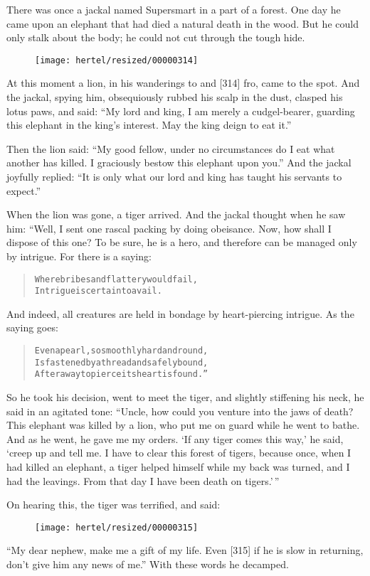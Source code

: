 \documentclass[article, twoside, 10pt]{memoir}
\renewenvironment{verbatim}{%
\begin{quote}%
\vskip -10pt%
\begin{alltt}\normalfont\small}{\end{alltt}%
\end{quote}%
\vskip -10pt
} %
\begin{document}
There was once a jackal named Supersmart in a part of a forest. One
day he came upon an elephant that had died a natural death in the
wood. But he could only stalk about the body; he could not cut
through the tough hide.

\begin{figure}[p]\texttt{[image: hertel/resized/00000314]}\end{figure}At this moment a lion, in his wanderings to and [314] fro, came to
the spot. And the jackal, spying him, obsequiously rubbed his scalp
in the dust, clasped his lotus paws, and said:
``My lord and king, I am merely a cudgel-bearer, guarding this elephant in the king's interest. May the king deign to eat it.''

Then the lion said:
``My good fellow, under no circumstances do I eat what another has killed. I graciously bestow this elephant upon you.''
And the jackal joyfully replied:
``It is only what our lord and king has taught his servants to expect.''

When the lion was gone, a tiger arrived. And the jackal thought
when he saw him: “Well, I sent one rascal packing by doing
obeisance. Now, how shall I dispose of this one? To be sure, he is
a hero, and therefore can be managed only by intrigue. For there is
a saying:

\begin{verbatim}
Where bribes and flattery would fail,
Intrigue is certain to avail.
\end{verbatim}
And indeed, all creatures are held in bondage by heart-piercing
intrigue. As the saying goes:

\begin{verbatim}
Even a pearl, so smoothly hard and round,
Is fastened by a thread and safely bound,
After a way to pierce its heart is found.”
\end{verbatim}
So he took his decision, went to meet the tiger, and slightly
stiffening his neck, he said in an agitated tone:
``Uncle, how could you venture into the jaws of death? This elephant was killed by a lion, who put me on guard while he went to bathe. And as he went, he gave me my orders. `If any tiger comes this way,' he said, `creep up and tell me. I have to clear this forest of tigers, because once, when I had killed an elephant, a tiger helped himself while my back was turned, and I had the leavings. From that day I have been death on tigers.'\,''

On hearing this, the tiger was terrified, and said:
\begin{figure}[p]\texttt{[image: hertel/resized/00000315]}\end{figure}``My dear nephew, make me a gift of my life. Even [315] if he is slow in returning, don't give him any news of me.''
With these words he decamped.
\end{document}
